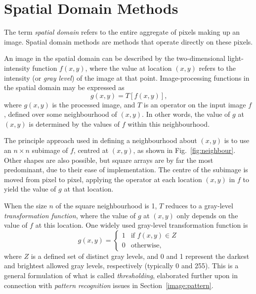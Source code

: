 
\section{Spatial Domain Methods}
\label{image:spatial}

The term {\em spatial domain\/} refers to the entire aggregate of
pixels making up an image.  Spatial domain methods are methods that
operate directly on these pixels.

An image in the spatial domain can be described by the two-dimensional
light-intensity function $f(x,y)$, where the value at location $(x,y)$
refers to the intensity (or {\em gray level\/}) of the image at that
point.  Image-processing functions in the spatial domain may be
expressed as
\begin{equation}
\label{eq:spatial_operator}
g(x,y)=T[f(x,y)]\mbox{,}
\end{equation}
where $g(x,y)$ is the processed image, and $T$ is an operator on the
input image $f$, defined over some neighbourhood of $(x,y)$.  In other
words, the value of $g$ at $(x,y)$ is determined by the values of $f$
within this neighbourhood.


The principle approach used in defining a neighbourhood about $(x,y)$
is to use an $n\times n$ subimage of $f$, centred at $(x,y)$, as shown
in Fig.~\ref{fig:neighbour}.  Other shapes are also possible, but
square arrays are by far the most predominant, due to their ease of
implementation.  The centre of the subimage is moved from pixel to
pixel, applying the operator at each location $(x,y)$ in $f$ to yield
the value of $g$ at that location.

When the size $n$ of the square neighbourhood is 1, $T$ reduces to a
gray-level {\em transformation function\/}, where the value of $g$ at
$(x,y)$ only depends on the value of $f$ at this location.  One widely
used gray-level transformation function is
\begin{equation}
\label{eq:threshold}
  g(x,y)=\left\{ \begin{array}{ll} 
                   1 & \mbox{if $f(x,y)\in Z$} \\ 
                   0 & \mbox{otherwise,}
                 \end{array} \right.
\end{equation}
where $Z$ is a defined set of distinct gray levels, and 0 and 1
represent the darkest and brightest allowed gray levels, respectively
(typically 0 and 255).  This is a general formulation of what is
called {\em thresholding\/}, elaborated further upon in connection
with {\em pattern recognition\/} issues in
Section~\ref{image:pattern}.

